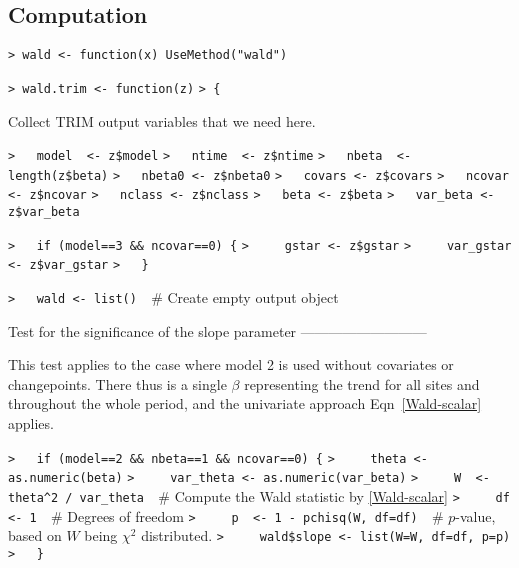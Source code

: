 \documentclass[a4paper]{article}
\begin{document}
\subsection{Computation}\par

\verb~> wald <- function(x) UseMethod("wald")~\par

\verb~> wald.trim <- function(z)~\newline
\verb~> {~\par
Collect TRIM output variables that we need here.\par
\verb~>   model  <- z$model~\newline
\verb~>   ntime  <- z$ntime~\newline
\verb~>   nbeta  <- length(z$beta)~\newline
\verb~>   nbeta0 <- z$nbeta0~\newline
\verb~>   covars <- z$covars~\newline
\verb~>   ncovar <- z$ncovar~\newline
\verb~>   nclass <- z$nclass~\newline
\verb~>   beta <- z$beta~\newline
\verb~>   var_beta <- z$var_beta~\par

\verb~>   if (model==3 && ncovar==0) {~\newline
\verb~>     gstar <- z$gstar~\newline
\verb~>     var_gstar <- z$var_gstar~\newline
\verb~>   }~\par

\verb~>   wald <- list()  ~{\sffamily\# Create empty output object}\par

Test for the significance of the slope parameter ---------------------------\par

This test applies to the case where model 2 is used without covariates or changepoints.
There thus is a single $\beta$ representing the trend for all sites and throughout the whole period,
and the univariate approach Eqn~\eqref{Wald-scalar} applies.\par
\verb~>   if (model==2 && nbeta==1 && ncovar==0) {~\newline
\verb~>     theta <- as.numeric(beta)~\newline
\verb~>     var_theta <- as.numeric(var_beta)~\newline
\verb~>     W  <- theta^2 / var_theta  ~{\sffamily\# Compute the Wald statistic by \eqref{Wald-scalar}}\newline
\verb~>     df <- 1  ~{\sffamily\# Degrees of freedom}\newline
\verb~>     p  <- 1 - pchisq(W, df=df)  ~{\sffamily\# $p$-value, based on $W$ being $\chi^2$ distributed.}\newline
\verb~>     wald$slope <- list(W=W, df=df, p=p)~\newline
\verb~>   }~\par
\end{document}
